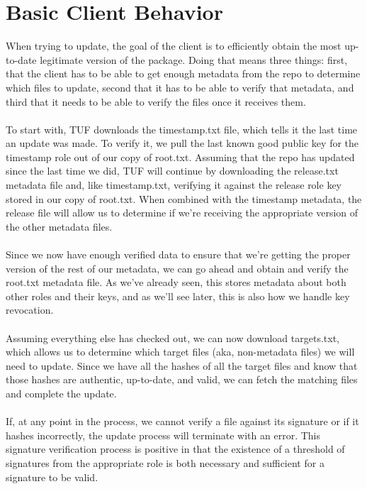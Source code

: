 \documentclass{article}
\begin{document}
\section{Basic Client Behavior}
When trying to update, the goal of the client is to efficiently obtain the most up-to-date
legitimate version of the package. Doing that means three things: first, that 
the client has to be able to get enough metadata from the repo to determine 
which files to update, second that it has to be able to verify that metadata, 
and third that it needs to be able to verify the files once it receives them. 
\\\\
To start with, TUF downloads the timestamp.txt file, which tells it the last 
time an update was made. To verify it, we pull the last known good public key for
the timestamp role out of our copy of root.txt. Assuming that the repo has updated
since the last time we did, TUF will continue by downloading the release.txt 
metadata file and, like timestamp.txt, verifying it against the release role key
stored in our copy of root.txt. When combined with the timestamp metadata, the
release file will allow us to determine if we're receiving the appropriate version 
of the other metadata files.
\\\\
Since we now have enough verified data to ensure that we're getting the proper
version of the rest of our metadata, we can go ahead and obtain and verify the 
root.txt metadata file. As we've already seen, this stores metadata about both 
other roles and their keys, and as we'll see later, this is also how we handle 
key revocation.
\\\\
Assuming everything else has checked out, we can now download targets.txt, which 
allows us to determine which target files (aka, non-metadata files) we will need
to update. Since we have all the hashes of all the target files and know that
those hashes are authentic, up-to-date, and valid, we can fetch the matching files
and complete the update.
\\\\
If, at any point in the process, we cannot verify a file against its signature
or if it hashes incorrectly, the update process will terminate with an error.
This signature verification process is positive in that the existence of a
threshold of signatures from the appropriate role is both necessary and sufficient
for a signature to be valid.
\end{document}
